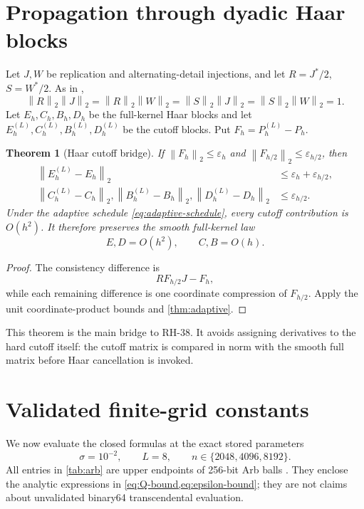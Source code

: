 \documentclass[11pt]{article}
\newtheorem{theorem}{Theorem}[section]
\theoremstyle{definition}
\theoremstyle{remark}
\newcommand{\norm}[1]{\left\lVert #1\right\rVert}
\begin{document}
\section{Propagation through dyadic Haar blocks}
\label{sec:haar}

Let $J,W$ be replication and alternating-detail injections, and let
$R=J^*/2$, $S=W^*/2$.  As in \citet{WangHaar2026},
\[
\norm R_2\norm J_2
=\norm R_2\norm W_2
=\norm S_2\norm J_2
=\norm S_2\norm W_2=1.
\]
Let $E_h,C_h,B_h,D_h$ be the full-kernel Haar blocks and let
$E_h^{(L)},C_h^{(L)},B_h^{(L)},D_h^{(L)}$ be the cutoff blocks.  Put
$F_h=P_h^{(L)}-P_h$.

\begin{theorem}[Haar cutoff bridge]
\label{thm:haar-bridge}
If $\norm{F_h}_2\le\varepsilon_h$ and
$\norm{F_{h/2}}_2\le\varepsilon_{h/2}$, then
\begin{align}
\norm{E_h^{(L)}-E_h}_2
&\le\varepsilon_h+\varepsilon_{h/2},
\label{eq:haar-E}\\
\norm{C_h^{(L)}-C_h}_2,
\norm{B_h^{(L)}-B_h}_2,
\norm{D_h^{(L)}-D_h}_2
&\le\varepsilon_{h/2}.
\label{eq:haar-CBD}
\end{align}
Under the adaptive schedule \eqref{eq:adaptive-schedule}, every cutoff
contribution is $O(h^2)$.  It therefore preserves the smooth full-kernel law
\[
E,D=O(h^2),\qquad C,B=O(h).
\]
\end{theorem}

\begin{proof}
The consistency difference is
\[
RF_{h/2}J-F_h,
\]
while each remaining difference is one coordinate compression of
$F_{h/2}$.  Apply the unit coordinate-product bounds and
\cref{thm:adaptive}.
\end{proof}

This theorem is the main bridge to RH-38.  It avoids assigning derivatives to
the hard cutoff itself: the cutoff matrix is compared in norm with the smooth
full matrix before Haar cancellation is invoked.

\section{Validated finite-grid constants}
\label{sec:constants}

We now evaluate the closed formulas at the exact stored parameters
\[
\sigma=10^{-2},\qquad L=8,
\qquad n\in\{2048,4096,8192\}.
\]
All entries in \cref{tab:arb} are upper endpoints of 256-bit Arb balls
\citep{Johansson2017,Rump2010}.  They enclose the analytic expressions in
\cref{eq:Q-bound,eq:epsilon-bound}; they are not claims about unvalidated
binary64 transcendental evaluation.
\end{document}
